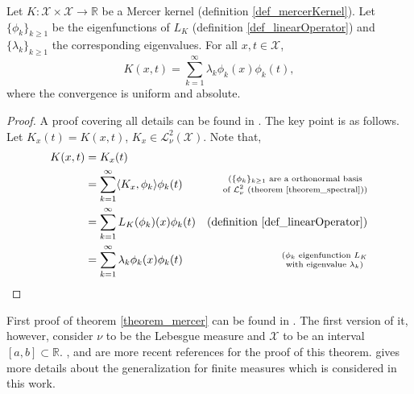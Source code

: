 \begin{theorem} \label{theorem_mercer}
Let $K: \mathcal{X} \times \mathcal{X} \to \mathbb{R}$ be a Mercer kernel (definition \ref{def_mercerKernel}). Let $\{ \phi_k \}_{k \geq 1}$ be the eigenfunctions of $L_K$ (definition \ref{def_linearOperator}) and $\{ \lambda_k \}_{k \geq 1}$ the corresponding eigenvalues. For all $x,t \in \mathcal{X}$,
\begin{equation} \label{eq_MercerTheorem}
  K(x,t) = \sum_{k=1}^{\infty} \lambda_k \phi_k(x) \phi_k(t),
\end{equation}
where the convergence is uniform and absolute.
\begin{proof}
  A proof covering all details can be found in \textcite{cucker2007}. The key point is as follows. Let $K_x(t) = K(x,t)$, $K_x \in \mathcal{L}_{\nu}^2(\mathcal{X})$. Note that,%
  \begin{equation*}
  \begin{aligned}
    K(x,t) &= K_x(t) \\
           &= \sum_{k=1}^{\infty} \langle K_x , \phi_k \rangle \phi_k(t) & 
                  \substack{\text{($\{ \phi_k \}_{k \geq 1}$ are a orthonormal basis}\\ \text{of $\mathcal{L}_{\nu}^2$ (theorem \ref{theorem_spectral}))}} \\
                    &= \sum_{k=1}^{\infty} L_K(\phi_k)(x) \phi_k(t) & \text{(definition \ref{def_linearOperator})} \\
                    &= \sum_{k=1}^{\infty} \lambda_k \phi_k(x) \phi_k(t) & 
                  \substack{\text{($\phi_k$ eigenfunction $L_K$} \\ \text{with eigenvalue $\lambda_k$)}} \\
  \end{aligned}
  \end{equation*}
\end{proof}
\end{theorem}

First proof of theorem \ref{theorem_mercer} can be found in \textcite{mercer1909}. The first version of it, however, consider $\nu$ to be the Lebesgue measure and $\mathcal{X}$ to be an interval $[a,b] \subset \mathbb{R}$. \textcite{hochstadt1989}, and \textcite{cucker2007} are more recent references for the proof of this theorem. \textcite{konig1986} gives more details about the generalization for finite measures which is considered in this work.

